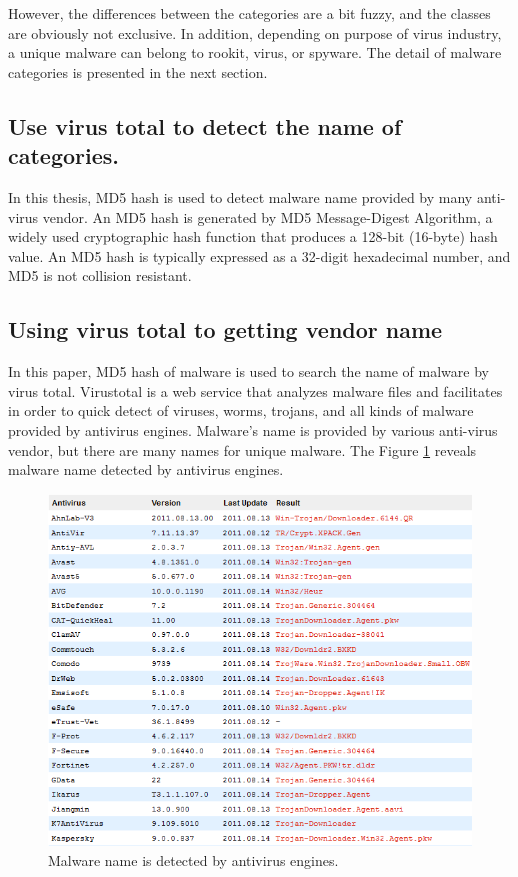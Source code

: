 However, the differences between the categories are a bit fuzzy, and the classes are obviously not exclusive. In addition, depending on purpose of virus industry, a unique malware can belong to rookit, virus, or spyware. The detail of malware categories is presented in the next section. 
\subsection{Use virus total to detect the name of categories.}

In this thesis, MD5 hash is used to detect malware name provided by many anti-virus vendor. An MD5 hash is generated by MD5 Message-Digest Algorithm, a widely used cryptographic hash function that produces a 128-bit (16-byte) hash value. An MD5 hash is typically expressed as a 32-digit hexadecimal number, and MD5 is not collision resistant\cite{wiki1}.

\subsection{Using virus total to getting vendor name}
In this paper, MD5 hash of malware is used to search the name of malware by virus total. Virustotal is a web service that analyzes malware files and facilitates in order to quick detect of viruses, worms, trojans, and all kinds of malware provided by antivirus engines. Malware's name is provided by various anti-virus vendor, but there are many names for unique malware. The Figure \ref{fig:virustotal_listname} reveals malware name detected by antivirus engines. 
\begin{figure}[h!]
\centering
\includegraphics[width=1.0\textwidth]{graph/virustotal_listname.png}
\caption{Malware name is detected by antivirus engines.}
\label{fig:virustotal_listname}
\end{figure}
